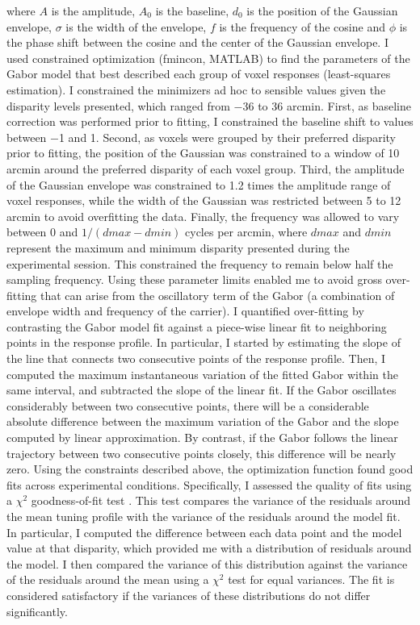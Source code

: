 where $A$ is the amplitude, $A_0$ is the baseline, $d_0$ is the position of the Gaussian envelope, $\sigma$ is the width of the envelope, $f$ is the frequency of the cosine and $\phi$ is the phase shift between the cosine and the center of the Gaussian envelope. I used constrained optimization (fmincon, MATLAB) to find the parameters of the Gabor model that best described each group of voxel responses (least-squares estimation). I constrained the minimizers ad hoc to sensible values given the disparity levels presented, which ranged from $-$36 to 36 arcmin. First, as baseline correction was performed prior to fitting, I constrained the baseline shift to values between $-$1 and 1. Second, as voxels were grouped by their preferred disparity prior to fitting, the position of the Gaussian was constrained to a window of 10 arcmin around the preferred disparity of each voxel group. Third, the amplitude of the Gaussian envelope was constrained to 1.2 times the amplitude range of voxel responses, while the width of the Gaussian was restricted between 5 to 12 arcmin to avoid overfitting the data. Finally, the frequency was allowed to vary between $0$ and $1/(dmax - dmin)$ cycles per arcmin, where $dmax$ and $dmin$ represent the maximum and minimum disparity presented during the experimental session. This constrained the frequency to remain below half the sampling frequency. Using these parameter limits enabled me to avoid gross over-fitting that can arise from the oscillatory term of the Gabor (a combination of envelope width and frequency of the carrier). I quantified over-fitting by contrasting the Gabor model fit against a piece-wise linear fit to neighboring points in the response profile. In particular, I started by estimating the slope of the line that connects two consecutive points of the response profile. Then, I computed the maximum instantaneous variation of the fitted Gabor within the same interval, and subtracted the slope of the linear fit. If the Gabor oscillates considerably between two consecutive points, there will be a considerable absolute difference between the maximum variation of the Gabor and the slope computed by linear approximation. By contrast, if the Gabor follows the linear trajectory between two consecutive points closely, this difference will be nearly zero.
Using the constraints described above, the optimization function found good fits across experimental conditions. Specifically, I assessed the quality of fits using a $\chi^2$ goodness-of-fit test \cite{DeAngelis:2003nh}. This test compares the variance of the residuals around the mean tuning profile with the variance of the residuals around the model fit. In particular, I computed the difference between each data point and the model value at that disparity, which provided me with a distribution of residuals around the model. I then compared the variance of this distribution against the variance of the residuals around the mean using a $\chi^2$ test for equal variances. The fit is considered satisfactory if the variances of these distributions do not differ significantly. 
